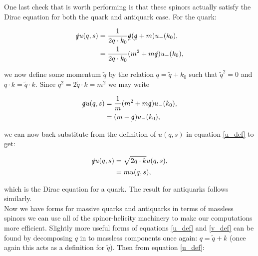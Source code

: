	One last check that is worth performing is that these spinors actually satisfy the Dirac equation for both the quark and antiquark case.  For the quark:

	\begin{subequations}
	\begin{align*}
		\slashed q u(q, s) &= \frac{1}{2q\cdot k_0}\slashed q(\slashed q + m)u_-(k_0), \\
		                   &= \frac{1}{2q\cdot k_0}(m^2 + m\slashed q)u_-(k_0), \\
	\end{align*}
	\end{subequations}

	we now define some momentum $\widetilde{q}$ by the relation $q = \widetilde{q} + k_0$ such that $\widetilde{q}^2=0$ and $q\cdot k = \widetilde{q}\cdot k$.  Since $q^2=2\widetilde{q}\cdot k=m^2$ we may write

	\begin{subequations}
	\begin{align*}
		\slashed q u(q, s) &= \frac{1}{m}(m^2 + m\slashed q)u_-(k_0), \\
		                   &= (m + \slashed q)u_-(k_0), \\
	\end{align*}
	\end{subequations}

	we can now back substitute from the definition of $u(q, s)$ in equation \ref{u_def} to get:

	\begin{subequations}
	\begin{align*}
		\slashed q u(q, s) &= \sqrt{2q\cdot k}u(q, s), \\
		                   &= mu(q,s), \\
	\end{align*}
	\end{subequations}

	which is the Dirac equation for a quark.  The result for antiquarks follows similarly.  \\Now we have forms for massive quarks and antiquarks in terms of massless spinors we can use all of the spinor-helicity machinery to make our computations more 	efficient.  Slightly more useful forms of equations \ref{u_def} and \ref{v_def} can be found by decomposing $q$ in to massless components once again: $q=\widetilde{q}+k$ (once again this acts as a definition for $\widetilde{q}$).  Then from equation \ref{u_def}:

